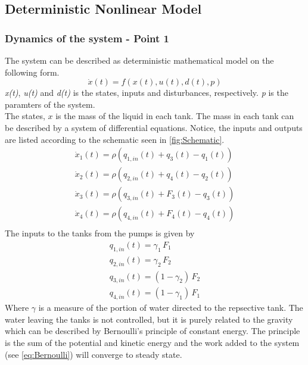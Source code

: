 \subsection{Deterministic Nonlinear Model}
\label{sec:Det_Model}
\subsubsection{Dynamics of the system - Point 1}
\label{sec:Dynamics}
The system can be described as deterministic mathematical model on the following form.
\begin{equation}
    \dot{x}(t)=f(x(t),u(t),d(t),p)
\end{equation}
\textit{x(t)}, \textit{u(t)} and \textit{d(t)} is the states, inputs and disturbances, respectively. \textit{p} is the paramters of the system.\\
The states, $x$ is the mass of the liquid in each tank. The mass in each tank can be described by a system of differential equations. Notice, the inputs and outputs are listed according to the schematic seen in \cref{fig:Schematic}.
\begin{equation}
    \begin{gathered}
        \dot{x}_1(t)=\rho(q_{1,in}(t)+q_3(t)-q_1(t))\\
        \dot{x}_2(t)=\rho(q_{2,in}(t)+q_4(t)-q_2(t))\\
        \dot{x}_3(t)=\rho(q_{3,in}(t)+F_3(t)-q_3(t))\\
        \dot{x}_4(t)=\rho(q_{4,in}(t)+F_4(t)-q_4(t))\\
    \end{gathered}
\end{equation}
The inputs to the tanks from the pumps is given by
\begin{equation}
    \begin{gathered}
        q_{1,in}(t)=\gamma_1\,F_1\\
        q_{2,in}(t)=\gamma_2\,F_2\\
        q_{3,in}(t)=(1-\gamma_2)\,F_2\\
        q_{4,in}(t)=(1-\gamma_1)\,F_1
    \end{gathered}
\end{equation}
Where $\gamma$ is a measure of the portion of water directed to the repsective tank. The water leaving the tanks is not controlled, but it is purely related to the gravity which can be described by Bernoulli's principle of constant energy. The principle is the sum of the potential and kinetic energy and the work added to the system (see \cref{eq:Bernoulli}) will converge to steady state.
